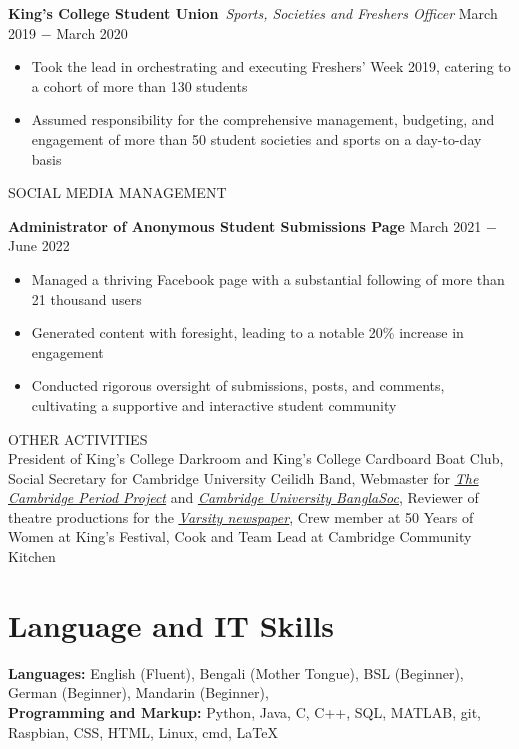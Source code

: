 \documentclass{article}
\begin{document}
\textbf{King's College Student Union}\
\textit{Sports, Societies and Freshers Officer }\hfill March 2019 $-$ March 2020
\begin{itemize}
    \item Took the lead in orchestrating and executing Freshers' Week 2019, catering to a cohort of more than 130 students
    \item Assumed responsibility for the comprehensive management, budgeting, and engagement of more than 50 student societies and sports on a day-to-day basis
\end{itemize} \medskip

\uppercase{Social Media Management}

\textbf{Administrator of Anonymous Student Submissions Page} \hfill March 2021 $-$ June 2022
\begin{itemize}
    \item Managed a thriving Facebook page with a substantial following of more than 21 thousand users
    \item Generated content with foresight, leading to a notable 20\% increase in engagement
    \item Conducted rigorous oversight of submissions, posts, and comments, cultivating a supportive and interactive student community
\end{itemize} \medskip

\uppercase{Other Activities}\\
President of King's College Darkroom and King's College Cardboard Boat Club, Social Secretary for Cambridge University Ceilidh Band, Webmaster for \href{http://tcpp.soc.srcf.net/}{\underline{\textit{The Cambridge Period Project}}} and \href{https://cambridgebanglasoc.org/}{\underline{\textit{Cambridge University BanglaSoc}}}, Reviewer of theatre productions for the \href{https://www.varsity.co.uk/profile/sheamol-obeda}{\underline{\textit{Varsity newspaper}}}, Crew member at 50 Years of Women at King's Festival, Cook and Team Lead at Cambridge Community Kitchen

\medskip

\vspace{-.75\baselineskip}
\hrulefill
\vspace{-.75\baselineskip}

\section*{Language and IT Skills}
\textbf{Languages:} English (Fluent), Bengali (Mother Tongue), 
BSL (Beginner), German (Beginner), Mandarin (Beginner),  \\
\textbf{Programming and Markup:} Python, Java, C, C++, SQL, MATLAB, git, Raspbian, CSS, HTML, Linux, cmd, \LaTeX\medskip
\end{document}
